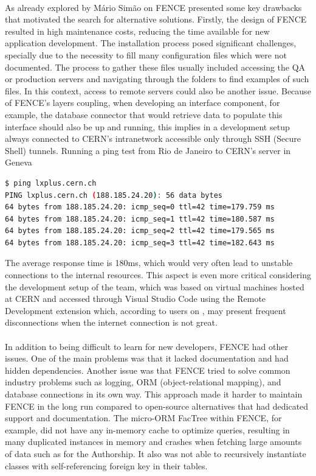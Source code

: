 \paragraph{} As already explored by Mário Simão on \cite{Simao2023Architectural} FENCE presented some key drawbacks that motivated the search for alternative solutions. Firstly, the design of FENCE resulted in high maintenance costs, reducing the time available for new application development. The installation process posed significant challenges, specially due to the necessity to fill many configuration files which were not documented. The process to gather these files usually included accessing the QA or production servers and navigating through the folders to find examples of such files. In this context, access to remote servers could also be another issue. Because of FENCE's layers coupling, when developing an interface component, for example, the database connector that would retrieve data to populate this interface should also be up and running, this implies in a development setup always connected to CERN's intranetwork accessible only through SSH (Secure Shell) tunnels. Running a ping test from Rio de Janeiro to CERN's server in Geneva

\begin{lstlisting}[language=bash]
$ ping lxplus.cern.ch
PING lxplus.cern.ch (188.185.24.20): 56 data bytes
64 bytes from 188.185.24.20: icmp_seq=0 ttl=42 time=179.759 ms
64 bytes from 188.185.24.20: icmp_seq=1 ttl=42 time=180.587 ms
64 bytes from 188.185.24.20: icmp_seq=2 ttl=42 time=179.565 ms
64 bytes from 188.185.24.20: icmp_seq=3 ttl=42 time=182.643 ms
\end{lstlisting}

\noindent
The average response time is 180ms, which would very often lead to unstable connections to the internal resources. This aspect is even more critical considering the development setup of the team, which was based on virtual machines hosted at CERN and accessed through Visual Studio Code using the Remote Development extension which, according to users on \cite{vscodeRemoteRelease}, may present frequent disconnections when the internet connection is not great.

\paragraph{} In addition to being difficult to learn for new developers, FENCE had other issues. One of the main problems was that it lacked documentation and had hidden dependencies. Another issue was that FENCE tried to solve common industry problems such as logging, ORM (object-relational mapping), and database connections in its own way. This approach made it harder to maintain FENCE in the long run compared to open-source alternatives that had dedicated support and documentation.
The micro-ORM FacTree within FENCE, for example, did not have any in-memory cache to optimize queries, resulting in many duplicated instances in memory and crashes when fetching large amounts of data such as for the Authorship. It also was not able to recursively instantiate classes with self-referencing foreign key in their tables.

